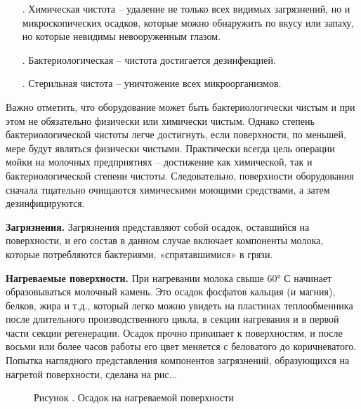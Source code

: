 {\begin{itemize}[leftmargin=2.15cm, labelwidth=0.65cm, labelsep=0.0cm]
	\item[\theitemcntr. ] Химическая чистота {--} удаление не только всех видимых загрязнений, но и микроскопических осадков, которые можно обнаружить по вкусу или запаху, но которые невидимы невооруженным глазом.
	\addtocounter{itemcntr}{1}
	
	\item[\theitemcntr. ] Бактериологическая {--} чистота достигается дезинфекцией.
	\addtocounter{itemcntr}{1}
	
	\item[\theitemcntr. ] Стерильная чистота {--} уничтожение всех микроорганизмов.
	\addtocounter{itemcntr}{1}
	
	\setcounter{itemcntr}{1}
\end{itemize}

\par \redline Важно отметить, что оборудование может быть бактериологически чистым и при этом не
обязательно физически или химически чистым. Однако степень бактериологической чистоты
легче достигнуть, если поверхности, по меньшей, мере будут являться физически чистыми.
Практически всегда цель операции мойки на молочных предприятиях {--} достижение как
химической, так и бактериологической степени чистоты. Следовательно, поверхности
оборудования сначала тщательно очищаются химическими моющими средствами, а затем
дезинфицируются.


\par \redline \textbf{Загрязнения.} Загрязнения представляют собой осадок, оставшийся на поверхности, и его состав в данном случае включает компоненты молока, которые потребляются бактериями, «спрятавшимися» в грязи.

\par \redline \textbf{Нагреваемые поверхности.} При нагревании молока свыше 60° С начинает образовываться молочный камень.
Это осадок фосфатов кальция (и магния), белков, жира и т.д., который легко можно увидеть на пластинах теплообменника после длительного производственного цикла, в секции нагревания и в первой части секции регенерации. Осадок прочно прикипает к поверхностям, и после восьми или более часов работы его цвет меняется с беловатого до коричневатого. Попытка наглядного представления компонентов загрязнений, образующихся на нагретой поверхности, сделана на рис.\thechaptercntr .\theimagecntr.

\begin{figure}[htb]
	\centering
	\def\svgwidth{\textwidth}
	
	\caption*{\gostFont Рисунок \thechaptercntr .\theimagecntr \spc {--} Осадок на нагреваемой поверхности}
	\label{fig:ris1}
\end{figure}

}
